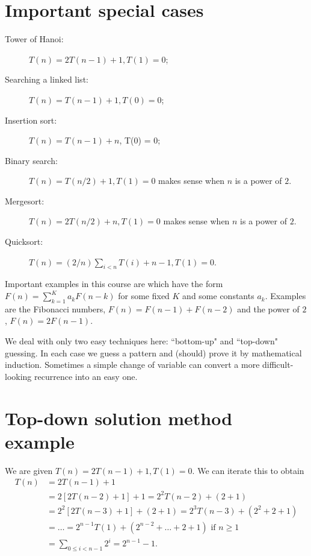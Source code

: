 \section{Important special cases}
\begin{description}
  \item[Tower of Hanoi:] $T(n) = 2 T(n - 1) + 1, T(1) = 0$;
  \item[Searching a linked list:] $T(n) = T(n - 1) + 1, T(0) = 0$;
  \item[Insertion sort:] $T(n) = T(n-1) + n$, T(0) = 0;
  \item[Binary search:] $T(n) = T(n/2) + 1, T(1) = 0$ makes sense when $n$ is a power of $2$. 
  \item[Mergesort:] $T(n) = 2T(n/2) + n, T(1) = 0$ makes sense when $n$ is a power of $2$.
  \item[Quicksort:] $T(n) = (2/n)\sum_{i<n} T(i) + n-1, T(1) = 0$.
\end{description}

Important examples  in this course are  which have the form 
$F(n) = \sum_{k=1}^K a_k F(n - k)$ for some fixed $K$ and some constants $a_k$. 
Examples are the Fibonacci numbers, $F(n) = F(n-1) + F(n-2)$ and the power of $2$, $F(n) = 2F(n-1)$.

We deal with only two easy techniques here: ``bottom-up" and ``top-down" guessing. 
In each case we guess a pattern and (should) prove it by mathematical induction. 
Sometimes a simple change of variable can convert a more difficult-looking recurrence into an easy one. 

\section{Top-down solution method example}
\begin{Boxample}
We are given $T(n) = 2 T(n - 1) + 1, T(1) = 0$. We can iterate this to obtain 
\begin{align*}
T(n) & = 2 T(n - 1) + 1  \\
& = 2 [2 T(n - 2) + 1] + 1 = 2^2 T(n-2) + (2 + 1) \\
& = 2^2 [2T(n - 3) + 1] + (2 + 1) = 2^3 T(n - 3) + (2^2 + 2+ 1)  \\ 
& = \dots = 2^{n-1} T(1) + (2^{n-2} + \dots + 2 + 1)  \text{ if $n \geq 1$} \\
& = \sum_{0\leq i < n-1} 2^i = 2^{n-1} - 1\text{.}
\end{align*}
\end{Boxample}

